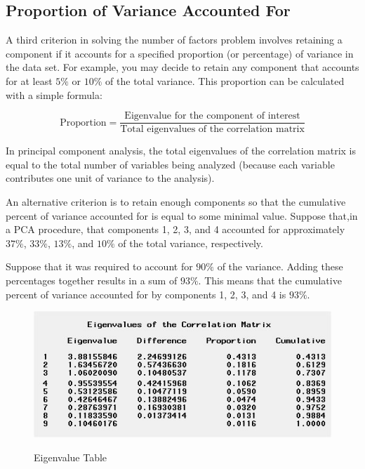 \documentclass[a4paper,12pt]{article}
\begin{document}
	\subsection{Proportion of Variance Accounted For}
	
	A third criterion in solving the number of factors
	problem involves retaining a component if it accounts for a specified proportion (or percentage)
	of variance in the data set.  For example, you may decide to retain any component that accounts
	for at least $5\%$ or $10\%$ of the total variance.  This proportion can be calculated with a simple
	formula:
	
	\[ \mbox{Proportion}  = \frac{\mbox{Eigenvalue for the component of interest}}{\mbox{Total eigenvalues of the correlation matrix}}  \]
	
	In principal component analysis, the total eigenvalues of the correlation matrix is equal to the
	total number of variables being analyzed (because each variable contributes one unit of variance
	to the analysis).
	
	An alternative criterion is to retain enough components so that the cumulative percent of variance
	accounted for is equal to some minimal value.  Suppose that,in a PCA procedure, that components 1, 2, 3,
	and 4 accounted for approximately $37\%$, $33\%$, $13\%$, and $10\%$ of the total variance, respectively.
	
	Suppose that it was required to account for $90\%$ of the variance. Adding these percentages together results in a sum of $93\%$.  This means that the cumulative percent of variance accounted for by components 1, 2, 3, and 4 is $93\%$.
	
	\begin{figure}[h!]
		\begin{center}
			\includegraphics[scale=0.9]{3AEigen.jpg}\\
			\caption{Eigenvalue Table}\label{Eigenvalue Table}
		\end{center}
		
	\end{figure}
	
\end{document}
